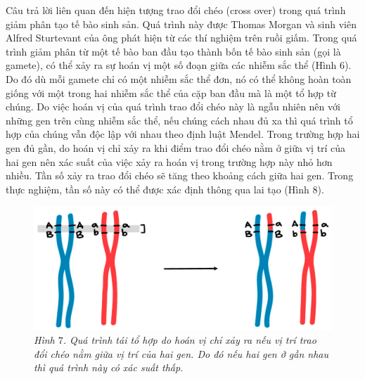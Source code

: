 \begin{multicols}{2}
\begin{figure}[H]
		\vspace*{-5pt}
	\end{figure}
	Câu trả lời liên quan đến hiện tượng trao đổi chéo (cross over) trong quá trình giảm phân tạo tế bào sinh sản. Quá trình này được Thomas Morgan và sinh viên Alfred Sturtevant của ông phát hiện từ các thí nghiệm trên ruồi giấm. Trong quá trình giảm phân từ một tế bào ban đầu tạo thành bốn tế bào sinh sản (gọi là gamete), có thể xảy ra sự hoán vị một số đoạn giữa các nhiễm sắc thể (Hình $6$). Do đó dù mỗi gamete chỉ có một nhiễm sắc thể đơn, nó có thể không hoàn toàn giống với một trong hai nhiễm sắc thể của cặp ban đầu mà là một tổ hợp từ chúng. Do việc hoán vị của quá trình trao đổi chéo này là ngẫu nhiên nên với những gen trên cùng nhiễm sắc thể, nếu chúng cách nhau đủ xa thì quá trình tổ hợp của chúng vẫn độc lập với nhau theo định luật Mendel.  
	\vskip 0.1cm
	Trong trường hợp hai gen đủ gần, do hoán vị chỉ xảy ra khi điểm trao đổi chéo nằm ở giữa vị trí của hai gen nên xác suất của việc xảy ra hoán vị trong trường hợp này nhỏ hơn nhiều. Tần số xảy ra trao đổi chéo sẽ tăng theo khoảng cách giữa hai gen. Trong thực nghiệm, tần số này có thể được xác định thông qua lai tạo (Hình $8$).
	\begin{figure}[H]
		\centering
		\vspace*{-5pt}
		\captionsetup{labelformat= empty, justification=centering}
		\includegraphics[width=1\linewidth]{image008}
		\caption{\small\textit{\color{timhieukhoahoc}Hình $7$. Quá trình tái tổ hợp do hoán vị chỉ xảy ra nếu vị trí trao đổi chéo nằm giữa vị trí của hai gen. Do đó nếu hai gen ở gần nhau thì quá trình này có xác suất thấp.}}
		\vspace*{-10pt}
	\end{figure}
	

\end{multicols}
